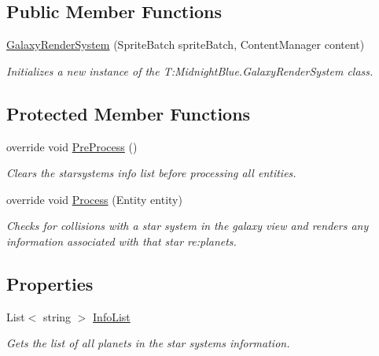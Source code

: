 \subsection*{Public Member Functions}
\begin{DoxyCompactItemize}
\item 
\hyperlink{class_midnight_blue_1_1_galaxy_render_system_aee5d42f0287d1bfed669e2a2656c5c28}{Galaxy\+Render\+System} (Sprite\+Batch sprite\+Batch, Content\+Manager content)
\begin{DoxyCompactList}\small\item\em Initializes a new instance of the T\+:\+Midnight\+Blue.\+Galaxy\+Render\+System class. \end{DoxyCompactList}\end{DoxyCompactItemize}
\subsection*{Protected Member Functions}
\begin{DoxyCompactItemize}
\item 
override void \hyperlink{class_midnight_blue_1_1_galaxy_render_system_a269f042fe0c55e47f3b23cc1930ed71a}{Pre\+Process} ()
\begin{DoxyCompactList}\small\item\em Clears the starsystems info list before processing all entities. \end{DoxyCompactList}\item 
override void \hyperlink{class_midnight_blue_1_1_galaxy_render_system_aabbf61a4bcfb7c026d2d0c9fbe90569f}{Process} (Entity entity)
\begin{DoxyCompactList}\small\item\em Checks for collisions with a star system in the galaxy view and renders any information associated with that star re\+:planets. \end{DoxyCompactList}\end{DoxyCompactItemize}
\subsection*{Properties}
\begin{DoxyCompactItemize}
\item 
List$<$ string $>$ \hyperlink{class_midnight_blue_1_1_galaxy_render_system_a2f252c64ec38b5bcf20c6b276fd5809b}{Info\+List}
\begin{DoxyCompactList}\small\item\em Gets the list of all planets in the star system\textquotesingle{}s information. \end{DoxyCompactList}\end{DoxyCompactItemize}


